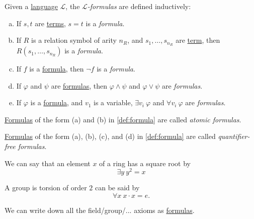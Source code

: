\begin{definition}[Formula]\label{def:formula}
	Given a \hyperref[def:language]{language} \(\mathcal{L} \), the \emph{\(\mathcal{L} \)-formulas} are defined inductively:
	\begin{enumerate}[(a)]
		\item If \(s, t\) are \hyperref[def:term]{terms}, \(s=t\) is a \emph{formula}.
		\item If \(R\) is a relation symbol of arity \(n_R\), and \(s_1, \ldots , s_{n_R}\) are \hyperref[def:term]{term}, then \(R(s_1, \ldots , s_{n_R})\) is a \emph{formula}.
		\item If \(f\) is a \hyperref[def:formula]{formula}, then \(\lnot f\) is a \emph{formula}.
		\item If \(\varphi\) and \(\psi\) are \hyperref[def:formula]{formulas}, then \(\varphi \land \psi \) and \(\varphi \lor \psi \) are \emph{formulas}.
		\item If \(\varphi \) is a \hyperref[def:formula]{formula}, and \(v_1\) is a variable, \(\exists v_i \ \varphi \) and \(\forall v_i \ \varphi \) are \emph{formulas}.
	\end{enumerate}
\end{definition}

\begin{notation}\label{not:atomic-formula}
	\hyperref[def:formula]{Formulas} of the form (a) and (b) in \autoref{def:formula} are called \emph{atomic formulas}.
\end{notation}

\begin{notation}\label{not:quantifiers-free-formula}
	\hyperref[def:formula]{Formulas} of the form (a), (b), (c), and (d) in \autoref{def:formula} are called \emph{quantifier-free formulas}.
\end{notation}

\begin{eg}
	We can say that an element \(x\) of a ring has a square root by
	\[
		\exists y\ y^2 = x
	\]
\end{eg}

\begin{eg}
	A group is torsion of order \(2\) can be said by
	\[
		\forall x\ x\cdot x = e.
	\]
\end{eg}

\begin{eg}
	We can write down all the field/group/... axioms as \hyperref[def:formula]{formulas}.
\end{eg}

